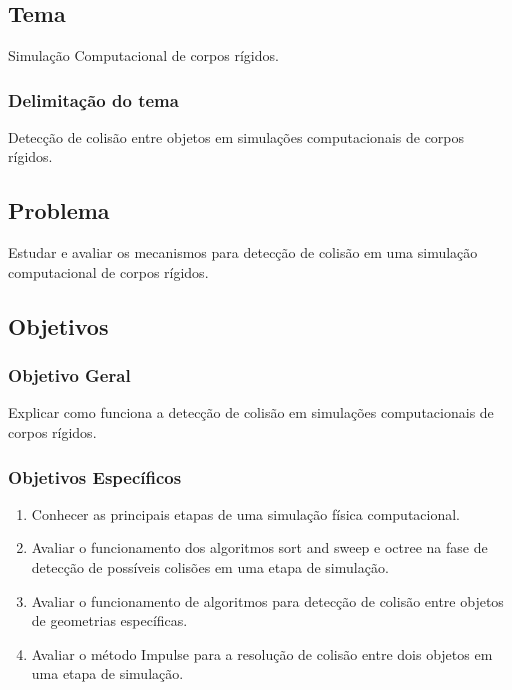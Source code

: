 \chapter*[]{}

\section{Tema}

Simulação Computacional de corpos rígidos.

\subsection{Delimitação do tema}

Detecção de colisão entre objetos em simulações computacionais de corpos rígidos.

\section{Problema}

 Estudar e avaliar os mecanismos para detecção de colisão em uma simulação computacional de corpos rígidos.


\section{Objetivos}
\subsection{Objetivo Geral}
Explicar como funciona a detecção de colisão em simulações computacionais de corpos rígidos.

\subsection{Objetivos Específicos}
\begin{enumerate}
\item Conhecer as principais etapas de uma simulação física computacional.
\item Avaliar o funcionamento dos algoritmos sort and sweep e octree na fase de detecção de possíveis colisões em uma etapa de simulação.
\item Avaliar o funcionamento de algoritmos para detecção de colisão entre objetos de geometrias específicas.
\item Avaliar o método Impulse para a resolução de colisão entre dois objetos em uma etapa de simulação.
\end{enumerate}

